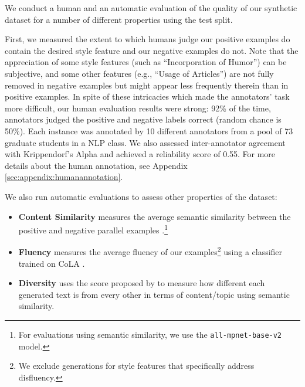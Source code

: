 We conduct a human and an automatic evaluation of the quality of our synthetic dataset for a number of different properties using the test split. %

First, we measured the extent to which humans judge our positive examples do contain the desired style feature  and our negative examples do not. Note that the appreciation of some style features  (such as ``Incorporation of Humor'') can be subjective, and some other features (e.g., ``Usage of Articles'') %
are not fully removed in negative examples but might appear less frequently therein than in positive examples. In spite of these intricacies which made the annotators' task more difficult, our human evaluation results were strong: 92\% of the time, annotators judged the positive and negative labels correct (random chance is 50\%).
Each %
instance was annotated by 10 different annotators from a pool of 73  %
graduate students in a NLP class. %
We also assessed inter-annotator agreement with Krippendorf's Alpha \citep{krippendorffalpha} and achieved a reliability score of 0.55. For more details about the human annotation, see Appendix \ref{sec:appendix:humanannotation}. 

We also run automatic evaluations to assess other properties of the dataset: 
\begin{itemize}
    \setlength\itemsep{1pt}
    \item \textbf{Content Similarity} measures the average semantic similarity between the positive and negative parallel examples \citep{sentencetransformers}.\footnote{For %
    evaluations using semantic similarity, we use the \texttt{all-mpnet-base-v2} model.}
\item \textbf{Fluency} measures the average fluency of our examples\footnote{We exclude generations for style features that specifically address disfluency.} %
using a classifier trained on CoLA \citep{cola}. 
\item \textbf{Diversity} uses the %
score proposed by \citet{diversityscore} to measure %
how different each generated text %
is from every other in terms of content/topic using semantic similarity.%


\end{itemize}

